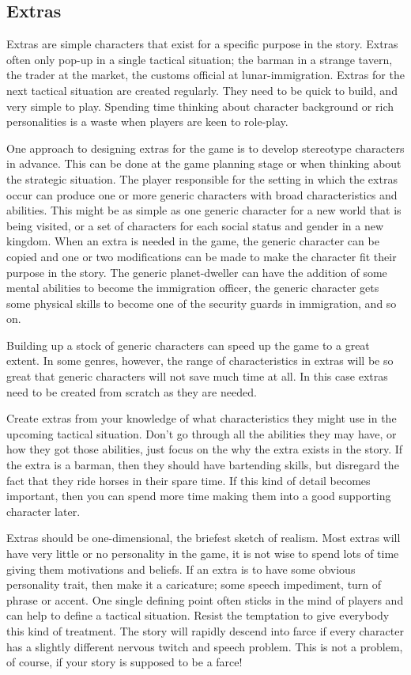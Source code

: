 \documentclass[twoside]{book}
\begin{document}
\subsection{Extras}

Extras are simple characters that exist for a specific purpose in the
story. Extras often only pop-up in a single tactical situation; the
barman in a strange tavern, the trader at the market, the customs
official at lunar-immigration. Extras for the next tactical situation
are created regularly. They need to be quick to build, and very simple
to play. Spending time thinking about character background or rich
personalities is a waste when players are keen to role-play.

One approach to designing extras for the game is to develop stereotype
characters in advance. This can be done at the game planning stage or
when thinking about the strategic situation. The player responsible
for the setting in which the extras occur can produce one or more
generic characters with broad characteristics and abilities. This
might be as simple as one generic character for a new world that is
being visited, or a set of characters for each social status and
gender in a new kingdom. When an extra is needed in the game, the
generic character can be copied and one or two modifications can be
made to make the character fit their purpose in the story. The generic
planet-dweller can have the addition of some mental abilities to
become the immigration officer, the generic character gets some
physical skills to become one of the security guards in immigration,
and so on.

Building up a stock of generic characters can speed up the game to a
great extent. In some genres, however, the range of characteristics in
extras will be so great that generic characters will not save much
time at all. In this case extras need to be created from scratch as
they are needed.

Create extras from your knowledge of what characteristics they might
use in the upcoming tactical situation. Don't go through all the
abilities they may have, or how they got those abilities, just focus
on the why the extra exists in the story. If the extra is a barman,
then they should have bartending skills, but disregard the fact that
they ride horses in their spare time. If this kind of detail becomes
important, then you can spend more time making them into a good
supporting character later.

Extras should be one-dimensional, the briefest sketch of realism. Most
extras will have very little or no personality in the game, it is not
wise to spend lots of time giving them motivations and beliefs. If an
extra is to have some obvious personality trait, then make it a
caricature; some speech impediment, turn of phrase or accent. One
single defining point often sticks in the mind of players and can help
to define a tactical situation. Resist the temptation to give
everybody this kind of treatment. The story will rapidly descend into
farce if every character has a slightly different nervous twitch and
speech problem. This is not a problem, of course, if your story is
supposed to be a farce!
\end{document}

